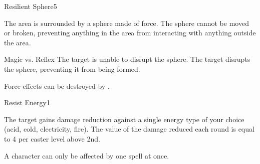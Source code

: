 \begin{spellsection}{Resilient Sphere}{5}
\begin{spellheader}
    \spellrng{\rngmed}
\end{spellheader}
\begin{spellcontent}
    \begin{spelltargetinginfo}
    \end{spelltargetinginfo}
    \begin{spelleffects}
        \spelleffect The area is surrounded by a sphere made of force. The sphere cannot be moved or broken, preventing anything in the area from interacting with anything outside the area.
        \begin{spellattack}{Magic vs. Reflex}
            \spellsuccess The target is unable to disrupt the sphere.
            \spellfailure The target disrupts the sphere, preventing it from being formed.
        \end{spellattack}
        \spelldur \durshort \dismissable
    \end{spelleffects}
\end{spellcontent}
\begin{spellfooter}
    \spellnotes Force effects can be destroyed by .
\end{spellfooter}
\end{spellsection}

\begin{spellsection}{Resist Energy}{1}
\begin{spellheader}
\end{spellheader}
\begin{spellcontent}
    \begin{spelltargetinginfo}
    \end{spelltargetinginfo}
    \begin{spelleffects}
        \spelleffect The target gains damage reduction against a single energy type of your choice (acid, cold, electricity, fire). The value of the damage reduced each round is equal to 4  per caster level above 2nd.
        \spelldur \durpersonallong
    \end{spelleffects}
\end{spellcontent}
\begin{spellfooter}
    \spellnotes A character can only be affected by one  spell at once.
\end{spellfooter}
\end{spellsection}

